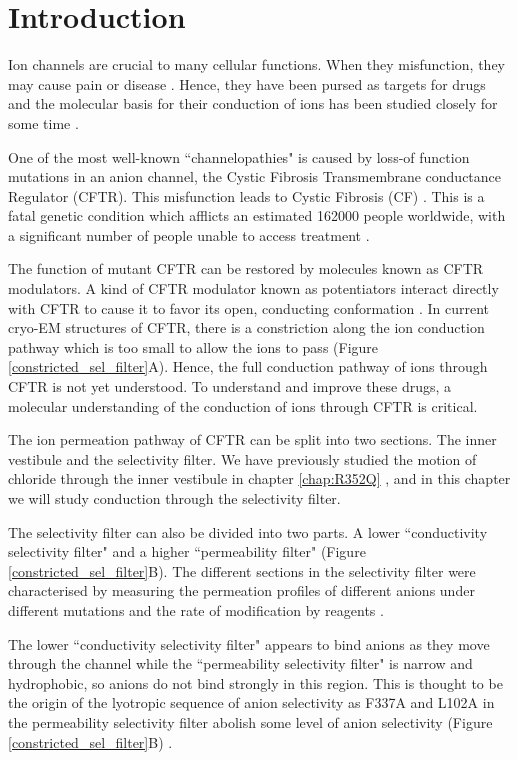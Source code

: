 \section{Introduction}

Ion channels are crucial to many cellular functions. When they misfunction, they may cause pain or disease \cite{kingwell2019, kim2014}. Hence, they have been pursed as targets for drugs and the molecular basis for their conduction of ions has been studied closely for some time \cite{santos2017, doyle1998, roux1993}.

One of the most well-known ``channelopathies" is caused by loss-of function mutations in an anion channel, the Cystic Fibrosis Transmembrane conductance Regulator (CFTR). This misfunction leads to Cystic Fibrosis (CF) \cite{riordan1989,gadsby2006}. This is a fatal genetic condition which afflicts an estimated 162000 people worldwide, with a significant number of people unable to access treatment \cite{guo2022}.

The function of mutant CFTR can be restored by molecules known as CFTR modulators. A kind of CFTR modulator known as potentiators interact directly with CFTR to cause it to favor its open, conducting conformation \cite{liu2019}. In current cryo-EM structures of CFTR, there is a constriction along the ion conduction pathway which is too small to allow the ions to pass \cite{zhang2018} (Figure \ref{constricted_sel_filter}A). Hence, the full conduction pathway of ions through CFTR is not yet understood. To understand and improve these drugs, a molecular understanding of the conduction of ions through CFTR is critical. 

The ion permeation pathway of CFTR can be split into two sections. The inner vestibule and the selectivity filter. We have previously studied the motion of chloride through the inner vestibule in chapter \ref{chap:R352Q} \cite{wong2022a}, and in this chapter we will study conduction through the selectivity filter.

The selectivity filter can also be divided into two parts. A lower ``conductivity selectivity filter" and a higher ``permeability filter" (Figure \ref{constricted_sel_filter}B). The different sections in the selectivity filter were characterised by measuring the permeation profiles of different anions under different mutations and the rate of modification by reagents \cite{elhiani2010, linsdell2016}. 

The lower ``conductivity selectivity filter" appears to bind anions as they move through the channel while the ``permeability selectivity filter" is narrow and hydrophobic, so anions do not bind strongly in this region. This is thought to be the origin of the lyotropic sequence of anion selectivity as F337A and L102A in the permeability selectivity filter abolish some level of anion selectivity (Figure \ref{constricted_sel_filter}B) \cite{linsdell2021}. 

